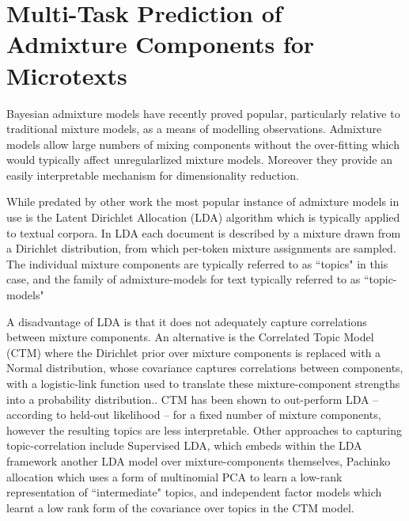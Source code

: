 

\section{Multi-Task Prediction of Admixture Components for Microtexts}
Bayesian admixture models have recently proved popular, particularly relative to traditional mixture models, as a means of modelling observations. Admixture models allow large numbers of mixing components without the over-fitting which would typically affect unregularlized mixture models. Moreover they provide an easily interpretable mechanism for dimensionality reduction.

While predated by other work\cite{Pritchard2000} the most popular instance of admixture models in use is the Latent Dirichlet Allocation (LDA) algorithm\cite{Blei2003} which is typically applied to textual corpora. In LDA each document is described by a mixture drawn from a Dirichlet distribution, from which per-token mixture assignments are sampled. The individual mixture components are typically referred to as ``topics" in this case, and the family of admixture-models for text typically referred to as ``topic-models"

A disadvantage of LDA is that it does not adequately capture correlations between mixture components. An alternative is the Correlated Topic Model (CTM) where the Dirichlet prior over mixture components is replaced with a Normal distribution, whose covariance captures correlations between components, with a logistic-link function used to translate these mixture-component strengths into a probability distribution.\cite{Blei2006}. CTM has been shown to out-perform LDA -- according to held-out likelihood -- for a fixed number of mixture components, however the resulting topics are less interpretable\cite{Chang2009}. Other approaches to capturing topic-correlation include Supervised LDA\cite{Rubin2011}, which embeds within the LDA framework another LDA model over mixture-components themselves, Pachinko allocation \cite{Li2006} which uses a form of multinomial PCA\cite{Buntine2002} to learn a low-rank representation of ``intermediate" topics, and independent factor models\cite{Putthividhya2009} which learnt a low rank form of the covariance over topics in the CTM model.

